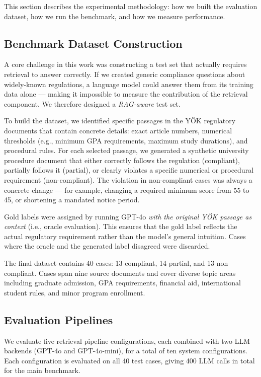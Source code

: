 This section describes the experimental methodology: how we built the evaluation dataset, how we run the benchmark, and how we measure performance.

\subsection{Benchmark Dataset Construction}

A core challenge in this work was constructing a test set that actually requires retrieval to answer correctly. If we created generic compliance questions about widely-known regulations, a language model could answer them from its training data alone — making it impossible to measure the contribution of the retrieval component. We therefore designed a \textit{RAG-aware} test set.

To build the dataset, we identified specific passages in the YÖK regulatory documents that contain concrete details: exact article numbers, numerical thresholds (e.g., minimum GPA requirements, maximum study durations), and procedural rules. For each selected passage, we generated a synthetic university procedure document that either correctly follows the regulation (compliant), partially follows it (partial), or clearly violates a specific numerical or procedural requirement (non-compliant). The violation in non-compliant cases was always a concrete change — for example, changing a required minimum score from 55 to 45, or shortening a mandated notice period.

Gold labels were assigned by running GPT-4o \textit{with the original YÖK passage as context} (i.e., oracle evaluation). This ensures that the gold label reflects the actual regulatory requirement rather than the model's general intuition. Cases where the oracle and the generated label disagreed were discarded.

The final dataset contains 40 cases: 13 compliant, 14 partial, and 13 non-compliant. Cases span nine source documents and cover diverse topic areas including graduate admission, GPA requirements, financial aid, international student rules, and minor program enrollment.

\subsection{Evaluation Pipelines}

We evaluate five retrieval pipeline configurations, each combined with two LLM backends (GPT-4o and GPT-4o-mini), for a total of ten system configurations. Each configuration is evaluated on all 40 test cases, giving 400 LLM calls in total for the main benchmark.

